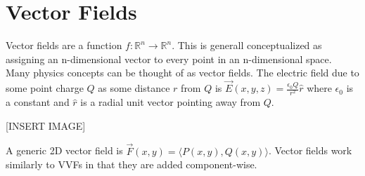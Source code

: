 \section{Vector Fields}
\noindent
Vector fields are a function $f:\mathbb{R}^n\to\mathbb{R}^n$. This is generall conceptualized as assigning an n-dimensional vector to every point in an n-dimensional space.\\
Many physics concepts can be thought of as vector fields. The electric field due to some point charge $Q$ as some distance $r$ from $Q$ is $\vec{E}(x,y,z)=\frac{\epsilon_{0}Q}{r^2}\hat{r}$ where $\epsilon_{0}$ is a constant and $\hat{r}$ is a radial unit vector pointing away from $Q$.

[INSERT IMAGE]

\noindent
A generic 2D vector field is $\vec{F}(x,y)=\langle P(x,y),Q(x,y)\rangle$. Vector fields work similarly to VVFs in that they are added component-wise.\\
